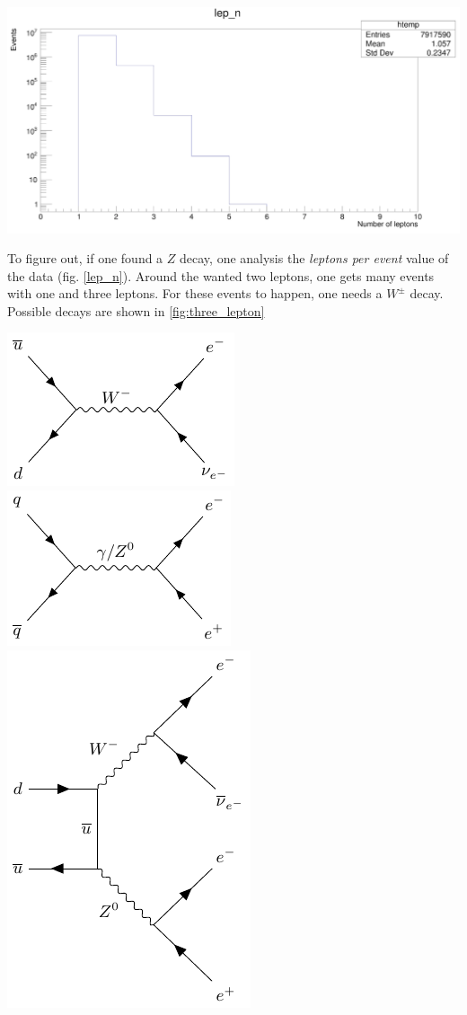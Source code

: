 \documentclass[12pt, a4paper, bibliography=totoc]{scrartcl}
\begin{document}
\begin{multicols}{2}
\begin{center}
	\includegraphics[width=0.8\linewidth]{fig/number_produced_leptons.png}
	\label{lep_n}
\end{center}

To figure out, if one found a $Z$ decay, one analysis the \textit{leptons per event} value of the data (fig. \ref{lep_n}).
Around the wanted two leptons, one gets many events with one and three leptons. 
For these events to happen, one needs a $W^{\pm}$ decay.
Possible decays are shown in \ref{fig:three_lepton}
    \begin{center}
        \includegraphics[width=0.45\linewidth]{fig/feynman_1.pdf} \hfill
        \includegraphics[width=0.45\linewidth]{fig/feynman_2.pdf} \\
        \includegraphics[width=0.45\linewidth]{fig/feynman_3.pdf}
\label{fig:three_lepton}
\end{center}


\end{multicols}
\end{document}
